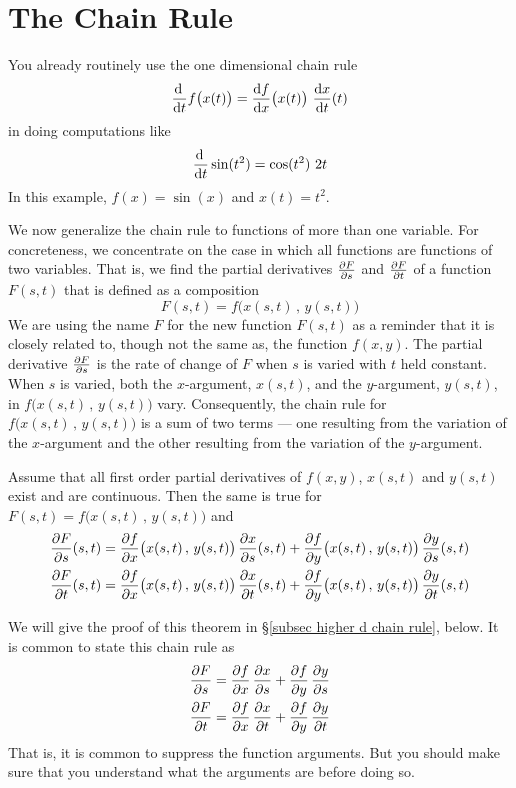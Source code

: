 \section{The Chain Rule}\label{sec chain rule}

You already routinely use the one dimensional chain
rule 
\begin{equation*}
\diff{}{t}f\big(x(t)\big) 
= \diff{f}{x}\big(x(t)\big)\ \diff{x}{t}(t)
\end{equation*}
in doing computations like 
\begin{equation*}
\diff{}{t}\sin(t^2) = \cos(t^2)\ 2t
\end{equation*}
In this example, $f(x)=\sin(x)$ and $x(t)=t^2$.

We now generalize the chain rule to functions of more than one variable.
For concreteness, we concentrate on the case in which all functions 
are functions of two variables. That is, we find the partial derivatives 
$\pdiff{F}{s}$ and $\pdiff{F}{t}$ of a function $F(s,t)$ that is defined
as a composition
\begin{equation*}
  F(s,t)=f\big(x(s,t)\,,\,y(s,t)\big)
\end{equation*}
We are using the name $F$ for the new function $F(s,t)$ as a reminder that
it is closely related to, though not the same as, the function $f(x,y)$.
The partial derivative $\pdiff{F}{s}$ is the rate of change of $F$ when $s$ is varied with $t$ held constant. When $s$ is varied, both the $x$-argument,
$x(s,t)$, and the $y$-argument, $y(s,t)$, in $f\big(x(s,t)\,,\,y(s,t)\big)$
vary. Consequently, the chain rule for $f\big(x(s,t)\,,\,y(s,t)\big)$
is a sum of two terms --- one resulting from the variation
of the $x$-argument and the other resulting from the variation of 
the $y$-argument.

\begin{theorem}\label{thm:chainRule}
Assume that all first order partial derivatives of $f(x,y)$, $x(s,t)$
and $y(s,t)$ exist and are continuous. Then the same is true for $F(s,t)=f\big(x(s,t)\,,\,y(s,t)\big)$ and
\begin{align*}
\pdiff{F}{s}(s,t)
&=  \pdiff{f}{x}\big(x(s,t)\,,\,y(s,t)\big)\, \pdiff{x}{s}(s,t)
   +\pdiff{f}{y}\big(x(s,t)\,,\,y(s,t)\big)\, \pdiff{y}{s}(s,t) \\
\pdiff{F}{t}(s,t)
&=  \pdiff{f}{x}\big(x(s,t)\,,\,y(s,t)\big)\, \pdiff{x}{t}(s,t)
   +\pdiff{f}{y}\big(x(s,t)\,,\,y(s,t)\big)\, \pdiff{y}{t}(s,t) 
\end{align*}
\end{theorem}\noindent
We will give the proof of this theorem in \S\ref{subsec higher d chain rule},
below. It is common to state this chain rule as 
\begin{align*}
\pdiff{F}{s}
&=  \pdiff{f}{x}\, \pdiff{x}{s}
   +\pdiff{f}{y}\, \pdiff{y}{s} \\
\pdiff{F}{t}
&=  \pdiff{f}{x}\, \pdiff{x}{t}
   +\pdiff{f}{y}\, \pdiff{y}{t} 
\end{align*}
That is, it is common to suppress the function arguments. But you 
should make sure that
you understand what the arguments are before doing so.

